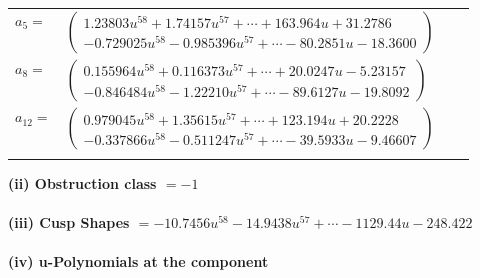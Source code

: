 \documentclass[1p]{elsarticle_modified}
\theoremstyle{definition}
\begin{document}
\begin{tabular}{m{7pt} m{180pt} m{7pt} m{180pt} }
\flushright $a_{5}=$&$\begin{pmatrix}1.23803 u^{58}+1.74157 u^{57}+\cdots+163.964 u+31.2786\\-0.729025 u^{58}-0.985396 u^{57}+\cdots-80.2851 u-18.3600\end{pmatrix}$ \\
\flushright $a_{8}=$&$\begin{pmatrix}0.155964 u^{58}+0.116373 u^{57}+\cdots+20.0247 u-5.23157\\-0.846484 u^{58}-1.22210 u^{57}+\cdots-89.6127 u-19.8092\end{pmatrix}$ \\
\flushright $a_{12}=$&$\begin{pmatrix}0.979045 u^{58}+1.35615 u^{57}+\cdots+123.194 u+20.2228\\-0.337866 u^{58}-0.511247 u^{57}+\cdots-39.5933 u-9.46607\end{pmatrix}$\\&\end{tabular}
\flushleft \textbf{(ii) Obstruction class $= -1$}\\~\\
\flushleft \textbf{(iii) Cusp Shapes $= -10.7456 u^{58}-14.9438 u^{57}+\cdots-1129.44 u-248.422$}\\~\\
\newpage\renewcommand{\arraystretch}{1}
\flushleft \textbf{(iv) u-Polynomials at the component}\newline \\
\end{document}

